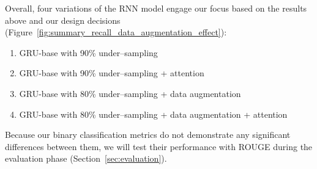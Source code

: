 Overall, four variations of the RNN model engage our focus based on the results above and our design decisions (Figure~\ref{fig:summary_recall_data_augmentation_effect}):
\begin{enumerate}
    \item GRU-base with 90\% under--sampling
    \item GRU-base with 90\% under--sampling + attention
    \item GRU-base with 80\% under--sampling + data augmentation
    \item GRU-base with 80\% under--sampling + data augmentation + attention
\end{enumerate}
Because our binary classification metrics do not demonstrate any significant differences between them, we will
test their performance with ROUGE during the evaluation phase (Section~\ref{sec:evaluation}).